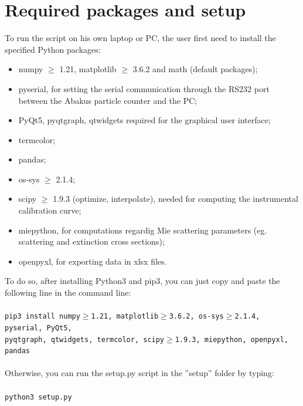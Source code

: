 \documentclass[a4paper, 11pt]{report}
\newcommand\blankpage{%
    \null
    \thispagestyle{empty}%
    \addtocounter{page}{-1}%
    \newpage}
\begin{document}
\section{Required packages and setup}
To run the script on his own laptop or PC, the user first need to install the specified Python packages:
\begin{itemize}
\item numpy $\geq$ 1.21, matplotlib $\geq$ 3.6.2 and math (default packages);
\item pyserial, for setting the serial communication through the RS232 port between the Abakus particle counter and the PC;
\item PyQt5, pyqtgraph, qtwidgets required for the graphical user interface;
\item termcolor;
\item pandas;
\item os-sys $\geq$ 2.1.4;
\item scipy $\geq$ 1.9.3 (optimize, interpolate), needed for computing the instrumental calibration curve;
\item miepython, for computations regardig Mie scattering parameters (eg. scattering and extinction cross sections);
\item openpyxl, for exporting data in xlsx files.
\end{itemize}
To do so, after installing Python3 and pip3, you can just copy and paste the following line in the command line: \\ \\
\texttt{pip3 install  numpy$\geq$1.21, matplotlib$\geq$3.6.2, os-sys$\geq$2.1.4, pyserial, PyQt5, \\ \hspace*{2.4 cm} pyqtgraph, qtwidgets, termcolor, scipy$\geq$1.9.3, miepython, openpyxl, \\ \hspace*{2.4 cm} pandas} \\ \\

Otherwise, you can run the setup.py script in the ''setup'' folder by typing: \\ \\
\texttt{python3 setup.py}

\newpage
\thispagestyle{plain}
\thispagestyle{empty}
\afterpage{\blankpage}


\end{document}
